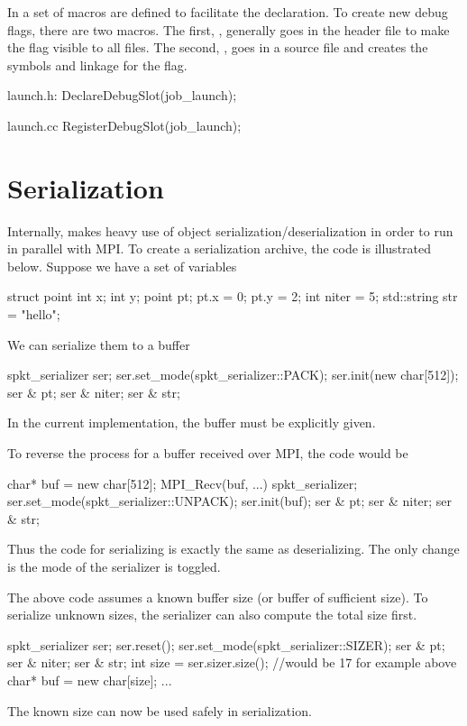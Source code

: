In  a set of macros are defined to facilitate the declaration.
To create new debug flags, there are two macros.
The first, , generally goes in the header file to make the flag visible to all files.
The second, , goes in a source file and creates the symbols and linkage for the flag.

\begin{CppCode}
launch.h:
DeclareDebugSlot(job_launch);

launch.cc
RegisterDebugSlot(job_launch);
\end{CppCode}

\section{Serialization}
Internally, \sstmacro makes heavy use of object serialization/deserialization in order to run in parallel with MPI.
To create a serialization archive, the code is illustrated below. Suppose we have a set of variables

\begin{CppCode}
struct point {
 int x;
 int y;
}
point pt;
pt.x = 0;
pt.y = 2;
int niter = 5;
std::string str = "hello";
\end{CppCode}

We can serialize them to a buffer

\begin{CppCode}
spkt_serializer ser;
ser.set_mode(spkt_serializer::PACK);
ser.init(new char[512]);
ser & pt;
ser & niter;
ser & str;
\end{CppCode}
In the current implementation, the buffer must be explicitly given.

To reverse the process for a buffer received over MPI, the code would be

\begin{CppCode}
char* buf = new char[512];
MPI_Recv(buf, ...)
spkt_serializer;
ser.set_mode(spkt_serializer::UNPACK);
ser.init(buf);
ser & pt;
ser & niter;
ser & str;
\end{CppCode}

Thus the code for serializing is exactly the same as deserializing. The only change is the mode of the serializer is toggled.

The above code assumes a known buffer size (or buffer of sufficient size).
To serialize unknown sizes, the serializer can also compute the total size first.

\begin{CppCode}
spkt_serializer ser;
ser.reset();
ser.set_mode(spkt_serializer::SIZER);
ser & pt;
ser & niter;
ser & str;
int size = ser.sizer.size(); //would be 17 for example above
char* buf = new char[size];
...
\end{CppCode}
The known size can now be used safely in serialization.

